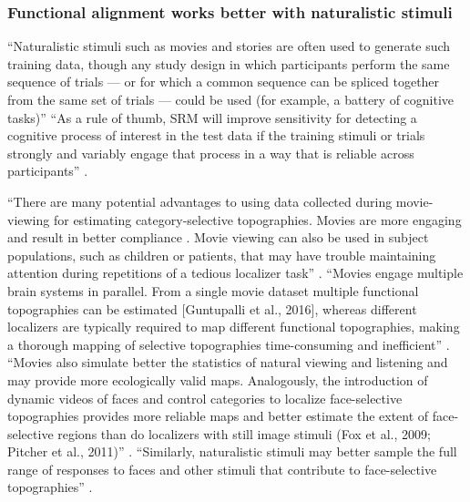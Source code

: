 \subsubsection{Functional alignment works better with naturalistic stimuli}


``Naturalistic stimuli such as movies and stories are often used to generate
such training data, though any study design in which participants perform the
same sequence of trials --- or for which a common sequence can be spliced
together from the same set of trials --- could be used (for example, a battery
of cognitive tasks)'' \citep{cohen2017computational}
%
``As a rule of thumb, SRM will improve sensitivity for detecting a cognitive
process of interest in the test data if the training stimuli or trials strongly
and variably engage that process in a way that is reliable across participants''
\citep{cohen2017computational}.

%
``There are many potential advantages to using data collected during
movie-viewing for estimating category-selective topographies. Movies are more
engaging and result in better compliance \citep{vanderwal2015inscapes}. Movie
viewing can also be used in subject populations, such as children
\citep{richardson2018development} or patients, that may have trouble maintaining
attention during repetitions of a tedious localizer task''
\citep{jiahui2020predicting}.
%
``Movies engage multiple brain systems in parallel. From a single movie dataset
multiple functional topographies can be estimated [Guntupalli et al., 2016],
whereas different localizers are typically required to map different functional
topographies, making a thorough mapping of selective topographies time-consuming
and inefficient'' \citep{jiahui2020predicting}.
%
``Movies also simulate better the statistics of natural viewing and listening
and may provide more ecologically valid maps. Analogously, the introduction of
dynamic videos of faces and control categories to localize face-selective
topographies provides more reliable maps and better estimate the extent of
face-selective regions than do localizers with still image stimuli (Fox et al.,
2009; Pitcher et al., 2011)'' \citep{jiahui2020predicting}.
%
``Similarly, naturalistic stimuli may better sample the full range of responses
to faces and other stimuli that contribute to face-selective topographies''
\citep{jiahui2020predicting}.


